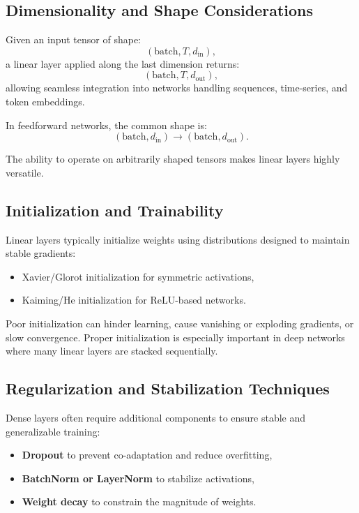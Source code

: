 \documentclass[12pt,a4paper]{report}
\begin{document}
\vspace{1em}
\subsection{Dimensionality and Shape Considerations}

Given an input tensor of shape:
\[
(\text{batch}, T, d_{\text{in}}),
\]
a linear layer applied along the last dimension returns:
\[
(\text{batch}, T, d_{\text{out}}),
\]
allowing seamless integration into networks handling sequences, time-series, and token embeddings.

In feedforward networks, the common shape is:
\[
(\text{batch}, d_{\text{in}}) \rightarrow (\text{batch}, d_{\text{out}}).
\]

The ability to operate on arbitrarily shaped tensors makes linear layers highly versatile.

\vspace{1em}
\subsection{Initialization and Trainability}

Linear layers typically initialize weights using distributions designed to maintain stable gradients:
\begin{itemize}
    \item Xavier/Glorot initialization for symmetric activations,
    \item Kaiming/He initialization for ReLU-based networks.
\end{itemize}

Poor initialization can hinder learning, cause vanishing or exploding gradients, or slow convergence.  
Proper initialization is especially important in deep networks where many linear layers are stacked sequentially.

\vspace{1em}
\subsection{Regularization and Stabilization Techniques}

Dense layers often require additional components to ensure stable and generalizable training:
\begin{itemize}
    \item \textbf{Dropout} to prevent co-adaptation and reduce overfitting,
    \item \textbf{BatchNorm or LayerNorm} to stabilize activations,
    \item \textbf{Weight decay} to constrain the magnitude of weights.
\end{itemize}
\end{document}
